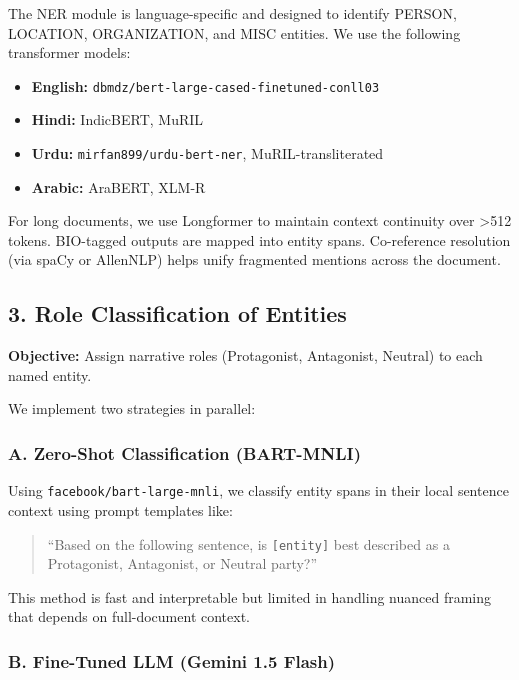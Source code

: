 \documentclass[12pt]{article}
\begin{document}
The NER module is language-specific and designed to identify PERSON, LOCATION, ORGANIZATION, and MISC entities. We use the following transformer models:

\begin{itemize}
    \item \textbf{English:} \texttt{dbmdz/bert-large-cased-finetuned-conll03}
    \item \textbf{Hindi:} IndicBERT, MuRIL
    \item \textbf{Urdu:} \texttt{mirfan899/urdu-bert-ner}, MuRIL-transliterated
    \item \textbf{Arabic:} AraBERT, XLM-R
\end{itemize}

For long documents, we use Longformer to maintain context continuity over >512 tokens. BIO-tagged outputs are mapped into entity spans. Co-reference resolution (via spaCy or AllenNLP) helps unify fragmented mentions across the document.

\subsection{3. Role Classification of Entities}

\textbf{Objective:} Assign narrative roles (Protagonist, Antagonist, Neutral) to each named entity.

We implement two strategies in parallel:

\subsubsection{A. Zero-Shot Classification (BART-MNLI)}

Using \texttt{facebook/bart-large-mnli}, we classify entity spans in their local sentence context using prompt templates like:

\begin{quote}
“Based on the following sentence, is \texttt{[entity]} best described as a Protagonist, Antagonist, or Neutral party?”
\end{quote}

This method is fast and interpretable but limited in handling nuanced framing that depends on full-document context.

\subsubsection{B. Fine-Tuned LLM (Gemini 1.5 Flash)}
\end{document}

